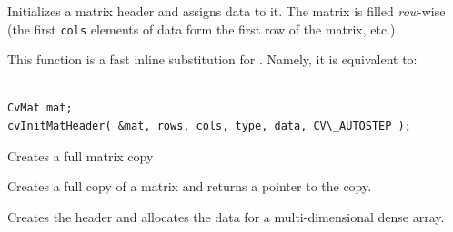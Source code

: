 \begin{description}
\end{description}

Initializes a matrix header and assigns data to it. The matrix is filled \textit{row}-wise (the first \texttt{cols} elements of data form the first row of the matrix, etc.)

This function is a fast inline substitution for . Namely, it is equivalent to:

\begin{lstlisting}

CvMat mat;
cvInitMatHeader( &mat, rows, cols, type, data, CV\_AUTOSTEP );

\end{lstlisting}


\label{CloneMat}

Creates a full matrix copy


\begin{description}
\end{description}

Creates a full copy of a matrix and returns a pointer to the copy.

\label{CreateMatND}

Creates the header and allocates the data for a multi-dimensional dense array.


\begin{description}
\end{description}

